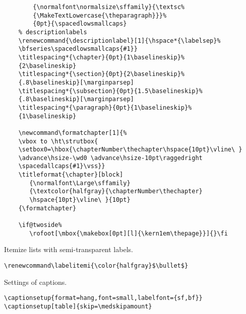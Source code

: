 \begin{lstlisting}
        {\normalfont\normalsize\sffamily}{\textsc%
        {\MakeTextLowercase{\theparagraph}}}%
        {0pt}{\spacedlowsmallcaps}
    % descriptionlabels
    \renewcommand{\descriptionlabel}[1]{\hspace*{\labelsep}%
    \bfseries\spacedlowsmallcaps{#1}}
    \titlespacing*{\chapter}{0pt}{1\baselineskip}%
    {2\baselineskip}
    \titlespacing*{\section}{0pt}{2\baselineskip}%
    {.8\baselineskip}[\marginparsep]
    \titlespacing*{\subsection}{0pt}{1.5\baselineskip}%
    {.8\baselineskip}[\marginparsep]
    \titlespacing*{\paragraph}{0pt}{1\baselineskip}%
    {1\baselineskip}

    \newcommand\formatchapter[1]{%
    \vbox to \ht\strutbox{
    \setbox0=\hbox{\chapterNumber\thechapter\hspace{10pt}\vline\ }
    \advance\hsize-\wd0 \advance\hsize-10pt\raggedright
    \spacedallcaps{#1}\vss}}
    \titleformat{\chapter}[block]
       {\normalfont\Large\sffamily}
       {\textcolor{halfgray}{\chapterNumber\thechapter}
       \hspace{10pt}\vline\ }{10pt}
    {\formatchapter}

    \if@twoside%
       \rofoot[\mbox{\makebox[0pt][l]{\kern1em\thepage}}]{}\fi
\end{lstlisting}



Itemize lists with semi-transparent labels.
\begin{lstlisting}
\renewcommand\labelitemi{\color{halfgray}$\bullet$}
\end{lstlisting}



Settings of captions.
\begin{lstlisting}
\captionsetup{format=hang,font=small,labelfont={sf,bf}}
\captionsetup[table]{skip=\medskipamount}
\end{lstlisting}





